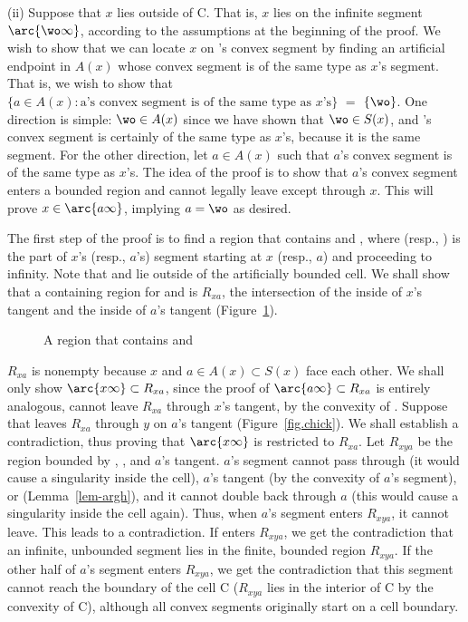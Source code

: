 

\clearpage

(ii) Suppose that $x$ lies outside of C.
That is, $x$ lies on the infinite segment $\arc{\wo\infty}$,
according to the assumptions at the beginning of the proof.
We wish to show that we can locate $x$ on \wo's convex segment
by finding an artificial endpoint
in $A(x)$ whose convex segment is of the same type as $x$'s segment.
That is, we wish to show that
\mbox{$\{a \in A(x): \mbox{a's convex segment is of the same type as $x$'s}\}$} $=$ 
$\{\wo\}$.
One direction is simple: $\wo \in A(x)$ since we have shown that $\wo \in S(x)$,
and \wo's convex segment is certainly of the same type as $x$'s, because it is the same
segment.
For the other direction, let $a \in A(x)$ such that $a$'s convex segment 
is of the same type as $x$'s.
The idea of the proof is to show that $a$'s convex segment
enters a bounded region and cannot legally leave except through $x$.
This will prove $x \in \arc{a\infty}$, implying $a = \wo$ as desired.

The first step of the proof is to find a region that contains
 and , where  (resp., ) is the part of
$x$'s (resp., $a$'s) segment starting at $x$ (resp., $a$) and proceeding to infinity.
Note that  and  lie outside of the artificially bounded cell.
We shall show that a containing region for  and  is 
$R_{xa}$, the intersection of the inside of $x$'s tangent and the inside of $a$'s tangent 
(Figure~\ref{fig-ax}).
%
\begin{figure}[tbp]\vspace{2in}\caption{A region that contains  and }\label{fig-ax}\end{figure}
%
$R_{xa}$ is nonempty because $x$ and $a \in A(x) \subset S(x)$ face each other.
We shall only show $\arc{x\infty} \subset R_{xa}$, since the proof of 
$\arc{a\infty} \subset R_{xa}$ is entirely analogous, 
 cannot leave $R_{xa}$ through $x$'s tangent, by the convexity of .
Suppose that  leaves $R_{xa}$ through
$y$ on $a$'s tangent (Figure~\ref{fig.chick}).
We shall establish a contradiction, thus proving that $\arc{x\infty}$ is restricted
to $R_{xa}$.
Let $R_{xya}$ be the region bounded by , , and $a$'s tangent.
$a$'s segment cannot pass through 
(it would cause a singularity inside the cell), $a$'s tangent (by 
the convexity of $a$'s segment), or  (Lemma~\ref{lem-argh}),
and it cannot double back through $a$
(this would cause a singularity inside the cell again).
Thus, when $a$'s segment enters $R_{xya}$, it cannot leave.
This leads to a contradiction.
If  enters $R_{xya}$, we get the contradiction that an infinite, 
unbounded segment lies in the finite, bounded region $R_{xya}$.
If the other half of $a$'s segment enters $R_{xya}$,
we get the contradiction that this segment cannot reach the boundary of the 
cell C ($R_{xya}$ lies in the interior of C by the convexity of C), 
although all convex segments originally start on a cell boundary.

